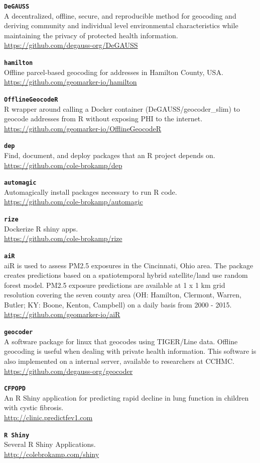 \textbf{\texttt{DeGAUSS}}~\\
A decentralized, offline, secure, and reproducible method for geocoding
and deriving community and individual level environmental
characteristics while maintaining the privacy of protected health
information.\\
\url{https://github.com/degauss-org/DeGAUSS}

\textbf{\texttt{hamilton}}~\\
Offline parcel-based geocoding for addresses in Hamilton County, USA.\\
\url{https://github.com/geomarker-io/hamilton}

\textbf{\texttt{OfflineGeocodeR}}~\\
R wrapper around calling a Docker container (DeGAUSS/geocoder\_slim) to
geocode addresses from R without exposing PHI to the internet.\\
\url{https://github.com/geomarker-io/OfflineGeocodeR}

\textbf{\texttt{dep}}~\\
Find, document, and deploy packages that an R project depends on.\\
\url{https://github.com/cole-brokamp/dep}

\textbf{\texttt{automagic}}~\\
Automagically install packages necessary to run R code.\\
\url{https://github.com/cole-brokamp/automagic}

\textbf{\texttt{rize}}~\\
Dockerize R shiny apps.\\
\url{https://github.com/cole-brokamp/rize}

\textbf{\texttt{aiR}}~\\
aiR is used to assess PM2.5 exposures in the Cincinnati, Ohio area. The
package creates predictions based on a spatiotemporal hybrid
satellite/land use random forest model. PM2.5 exposure predictions are
available at 1 x 1 km grid resolution covering the seven county area
(OH: Hamilton, Clermont, Warren, Butler; KY: Boone, Kenton, Campbell) on
a daily basis from 2000 - 2015.\\
\url{https://github.com/geomarker-io/aiR}

\textbf{\texttt{geocoder}}~\\
A software package for linux that geocodes using TIGER/Line data.
Offline geocoding is useful when dealing with private health
information. This software is also implemented on a internal server,
available to researchers at CCHMC.\\
\url{https://github.com/degauss-org/geocoder}

\textbf{\texttt{CFPOPD}}~\\
An R Shiny application for predicting rapid decline in lung function in
children with cystic fibrosis.\\
\url{http://clinic.predictfev1.com}

\textbf{\texttt{R\ Shiny}}~\\
Several R Shiny Applications.\\
\url{http://colebrokamp.com/shiny}
